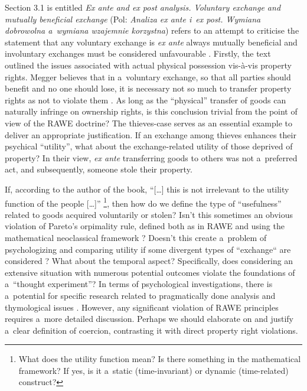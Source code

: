 Section 3.1 is entitled \textit{Ex ante and ex post analysis. Voluntary exchange and mutually beneficial exchange} (Pol: \textit{Analiza ex ante i~ex post. Wymiana dobrowolna a~wymiana wzajemnie korzystna}) refers to an attempt to criticise the statement that any voluntary exchange is \textit{ex ante} always mutually beneficial and involuntary exchanges must be considered unfavourable 
\parencite[][pp.59–73]{megger_sprawiedliwosc_2021}. %
 Firstly, the text outlined the issues associated with actual physical possession vis-à-vis property rights. Megger believes that in a~voluntary exchange, so that all parties should benefit and no one should lose, it is necessary not so much to transfer property rights as not to violate them 
\parencite[][p.59]{megger_sprawiedliwosc_2021}. %
 As long as the ``physical'' transfer of goods can naturally infringe on ownership rights, is this conclusion trivial from the point of view of the RAWE doctrine? The thieves-case serves as an essential example to deliver an appropriate justification. If an exchange among thieves enhances their psychical ``utility'', what about the exchange-related utility of those deprived of property? In their view, \textit{ex ante} transferring goods to others was not a~preferred act, and subsequently, someone stole their property.



If, according to the author of the book, ``[…] this is not irrelevant to the utility function of the people […]'' 
\parencite[][p.60]{megger_sprawiedliwosc_2021}%
\footnote{What does the utility function mean? Is there something in the mathematical framework? If yes, is it a~static (time-invariant) or dynamic (time-related) construct? }, then how do we define the type of ``usefulness'' related to goods acquired voluntarily or stolen? Isn't this sometimes an obvious violation of Pareto's orpimality rule, defined both as in RAWE 
\parencite[][]{rothbard_toward_2008} %
 and using the mathematical neoclassical framework 
\parencite[][pp.173–183]{}? %
 Doesn't this create a~problem of psychologizing and comparing utility if some divergent types of ``exchange`` are considered 
\parencite[][]{hausman_impossibility_1995}? %
 What about the temporal aspect? Specifically, does considering an extensive situation with numerous potential outcomes violate the foundations of a~``thought experiment''? In terms of psychological investigations, there is a~potential for specific research related to pragmatically done analysis and thymological issues 
\parencite[][pp.264–284]{}. %
 However, any significant violation of RAWE principles requires a~more detailed discussion. Perhaps we should elaborate on and justify a~clear definition of coercion, contrasting it with direct property right violations.



